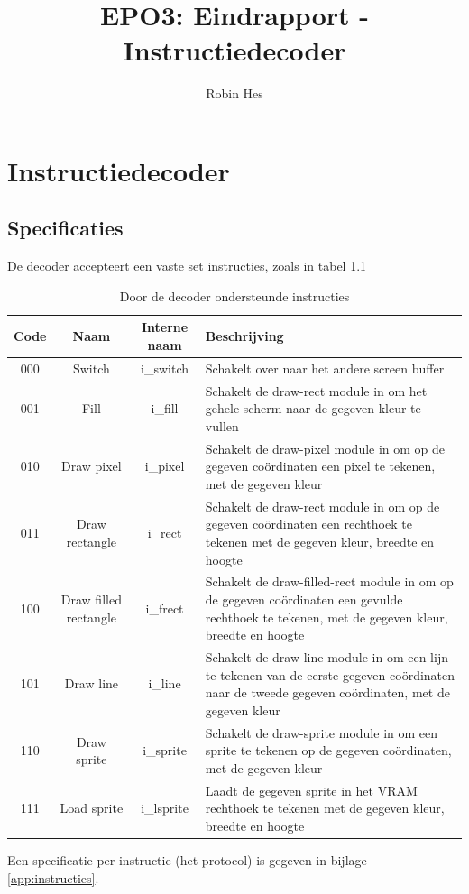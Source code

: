 \documentclass{scrartcl} %
\title{EPO3: Eindrapport - Instructiedecoder}
\author{Robin Hes}
\begin{document}
\chapter{Instructiedecoder}
\label{ch:decoder}
\section{Specificaties}
De decoder accepteert een vaste set instructies, zoals in tabel \ref{tab:decoder-instruction}

\begin{table}[H]
	\centering
	\caption{Door de decoder ondersteunde instructies}
	\label{tab:decoder-instruction}
	\begin{tabular}{c c c p{}}
		\hline\hline
		Code & Naam & Interne naam & Beschrijving \\
		\hline
		000 & Switch & i\_switch & Schakelt over naar het andere screen buffer \\
		001 & Fill & i\_fill & Schakelt de draw-rect module in om het gehele scherm naar de gegeven kleur te vullen \\
		010 & Draw pixel & i\_pixel & Schakelt de draw-pixel module in om op de gegeven coördinaten een pixel te tekenen, met de gegeven kleur \\
		011 & Draw rectangle & i\_rect & Schakelt de draw-rect module in om op de gegeven coördinaten een rechthoek te tekenen met de gegeven kleur, breedte en hoogte \\
		100 & Draw filled rectangle & i\_frect & Schakelt de draw-filled-rect module in om op de gegeven coördinaten een gevulde rechthoek te tekenen, met de gegeven kleur, breedte en hoogte \\
		101 & Draw line & i\_line & Schakelt de draw-line module in om een lijn te tekenen van de eerste gegeven coördinaten naar de tweede gegeven coördinaten, met de gegeven kleur \\
		110 & Draw sprite & i\_sprite & Schakelt de draw-sprite module in om een sprite te tekenen op de gegeven coördinaten, met de gegeven kleur \\
		111 & Load sprite & i\_lsprite & Laadt de gegeven sprite in het VRAM rechthoek te tekenen met de gegeven kleur, breedte en hoogte \\
		\end{tabular}
\end{table}
\small
Een specificatie per instructie (het protocol) is gegeven in bijlage \ref{app:instructies}.
\\\\
\end{document}
